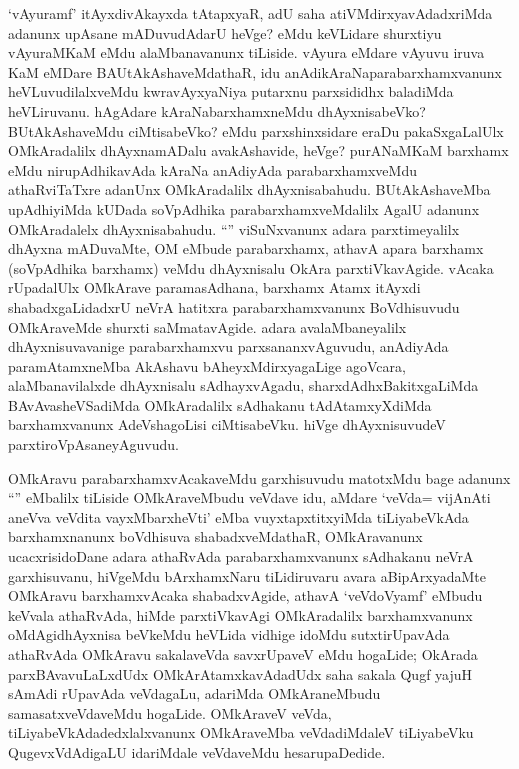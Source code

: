\begin{artha}
`vAyuramf' itAyxdivAkayxda tAtapxyaR, adU saha atiVMdirxyavAdadxriMda adanunx upAsane mADuvudAdarU heVge? eMdu keVLidare shurxtiyu vAyuraMKaM eMdu alaMbanavanunx tiLiside. vAyura eMdare vAyuvu iruva KaM eMDare BAUtAkAshaveMdathaR, idu anAdikAraNaparabarxhamxvanunx heVLuvudilalxveMdu kwravAyxyaNiya putarxnu parxsididhx baladiMda heVLiruvanu. hAgAdare kAraNabarxhamxneMdu dhAyxnisabeVko? BUtAkAshaveMdu ciMtisabeVko? eMdu parxshinxsidare eraDu pakaSxgaLalUlx OMkAradalilx dhAyxnamADalu avakAshavide, heVge? purANaMKaM barxhamx eMdu nirupAdhikavAda kAraNa anAdiyAda parabarxhamxveMdu athaRviTaTxre adanUnx OMkAradalilx dhAyxnisabahudu. BUtAkAshaveMba upAdhiyiMda kUDada soVpAdhika parabarxhamxveMdalilx AgalU adanunx OMkAradalelx dhAyxnisabahudu. ``\stext'' viSuNxvanunx adara parxtimeyalilx dhAyxna mADuvaMte, OM eMbude parabarxhamx, athavA apara barxhamx (soVpAdhika barxhamx) veMdu dhAyxnisalu OkAra parxtiVkavAgide. vAcaka rUpadalUlx OMkArave paramasAdhana, barxhamx Atamx itAyxdi shabadxgaLidadxrU neVrA hatitxra parabarxhamxvanunx BoVdhisuvudu OMkAraveMde shurxti saMmatavAgide. adara avalaMbaneyalilx dhAyxnisuvavanige parabarxhamxvu parxsananxvAguvudu, anAdiyAda paramAtamxneMba AkAshavu bAheyxMdirxyagaLige agoVcara, alaMbanavilalxde dhAyxnisalu sAdhayxvAgadu, sharxdAdhxBakitxgaLiMda BAvAvasheVSadiMda OMkAradalilx sAdhakanu tAdAtamxyXdiMda barxhamxvanunx AdeVshagoLisi ciMtisabeVku. hiVge dhAyxnisuvudeV parxtiroVpAsaneyAguvudu.
\end{artha}

\begin{artha}
OMkAravu  parabarxhamxvAcakaveMdu garxhisuvudu matotxMdu bage adanunx ``\stext'' eMbalilx tiLiside OMkAraveMbudu veVdave idu, aMdare `veVda= vijAnAti aneVva veVdita vayxMbarxheVti' eMba vuyxtapxtitxyiMda tiLiyabeVkAda barxhamxnanunx boVdhisuva shabadxveMdathaR, OMkAravanunx ucacxrisidoDane adara athaRvAda parabarxhamxvanunx sAdhakanu neVrA garxhisuvanu, hiVgeMdu bArxhamxNaru tiLidiruvaru avara aBipArxyadaMte OMkAravu barxhamxvAcaka shabadxvAgide, athavA `veVdoV\s yamf' eMbudu keVvala athaRvAda, hiMde parxtiVkavAgi OMkAradalilx barxhamxvanunx oMdAgidhAyxnisa beVkeMdu heVLida vidhige idoMdu sutxtirUpavAda athaRvAda OMkAravu sakalaveVda savxrUpaveV eMdu hogaLide; OkArada parxBAvavuLaLxdUdx OMkArAtamxkavAdadUdx saha sakala Qugf yajuH sAmAdi rUpavAda veVdagaLu, adariMda OMkAraneMbudu samasatxveVdaveMdu hogaLide. 
OMkAraveV veVda, tiLiyabeVkAdadedxlalxvanunx OMkAraveMba veVdadiMdaleV tiLiyabeVku QugevxVdAdigaLU idariMdale veVdaveMdu hesarupaDedide.
\end{artha}


